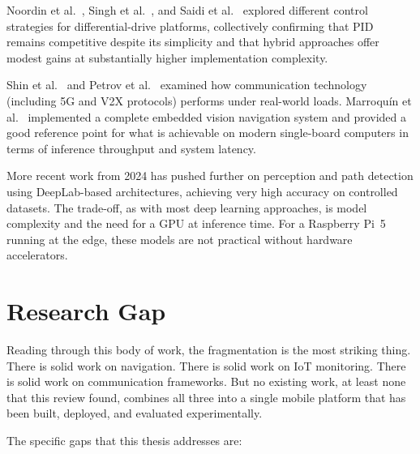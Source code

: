 Noordin et al.\ \cite{r11}, Singh et al.\ \cite{r26}, and Saidi
et al.\ \cite{r27} explored different control strategies for
differential-drive platforms, collectively confirming that PID remains
competitive despite its simplicity and that hybrid approaches offer
modest gains at substantially higher implementation complexity.

Shin et al.\ \cite{r28} and Petrov et al.\ \cite{r25} examined how
communication technology (including 5G and V2X protocols) performs
under real-world loads. Marroqu\'{i}n et al.\ \cite{r29} implemented
a complete embedded vision navigation system and provided a good
reference point for what is achievable on modern single-board computers
in terms of inference throughput and system latency.

More recent work from 2024 \cite{r30} has pushed further on perception
and path detection using DeepLab-based architectures, achieving very
high accuracy on controlled datasets. The trade-off, as with most
deep learning approaches, is model complexity and the need for a GPU
at inference time. For a Raspberry Pi~5 running at the edge, these
models are not practical without hardware accelerators.

\section{Research Gap}

Reading through this body of work, the fragmentation is the most
striking thing. There is solid work on navigation. There is solid work
on IoT monitoring. There is solid work on communication frameworks.
But no existing work, at least none that this review found,
combines all three into a single mobile platform that has been built,
deployed, and evaluated experimentally.

The specific gaps that this thesis addresses are:


